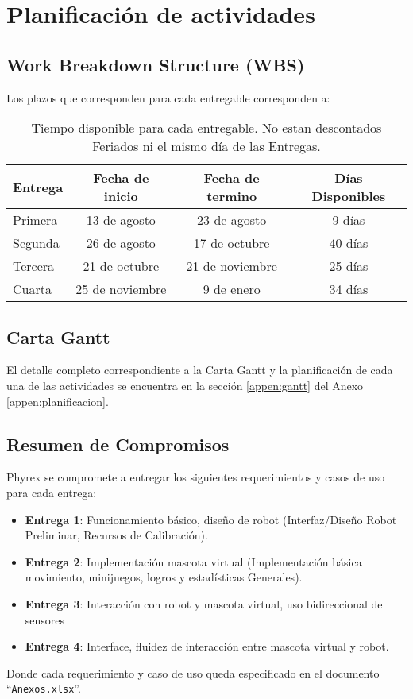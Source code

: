 \chapter{Planificaci\'on de actividades}
\newpage
\section{Work Breakdown Structure (WBS)}

Los plazos que corresponden para cada entregable corresponden a:
\begin{table}[H]
  \centering
  \begin{tabular}{|l|c|c|c|}\hline
    {\bf Entrega} & {\bf Fecha de inicio} & {\bf Fecha de termino} & {\bf D\'ias Disponibles}\\\hline
    Primera & 13 de agosto    & 23 de agosto    &  9 d\'ias \\\hline
    Segunda & 26 de agosto    & 17 de octubre   & 40 d\'ias \\\hline 
    Tercera & 21 de octubre   & 21 de noviembre & 25 d\'ias \\\hline 
    Cuarta  & 25 de noviembre & 9 de enero      & 34 d\'ias \\\hline 
  \end{tabular}
  \label{tab:Fechas}
  \caption[~Tiempo Disponible para Entregables]{Tiempo disponible para cada entregable. No estan descontados Feriados ni el mismo d\'ia de las Entregas.}
\end{table}


\section{Carta Gantt}
El detalle completo correspondiente a la Carta Gantt y la planificaci\'on de cada una de las actividades se encuentra en la secci\'on \ref{appen:gantt} del Anexo \ref{appen:planificacion}.

\section{Resumen de Compromisos}
Phyrex se compromete a entregar los siguientes requerimientos y casos de uso para cada entrega:

\begin{itemize}
\item {\bf Entrega 1}: Funcionamiento b\'asico, dise\~no de robot (Interfaz/Dise\~no Robot Preliminar, Recursos de Calibraci\'on).
\item {\bf Entrega 2}: Implementaci\'on mascota virtual (Implementaci\'on b\'asica movimiento, minijuegos, logros y estad\'isticas Generales).
\item {\bf Entrega 3}: Interacci\'on con robot y mascota virtual, uso bidireccional de sensores
\item {\bf Entrega 4}: Interface, fluidez de interacci\'on entre mascota virtual y robot.
\end{itemize}

Donde cada requerimiento y caso de uso queda especificado en el documento ``\verb+Anexos.xlsx+''.
\newpage
